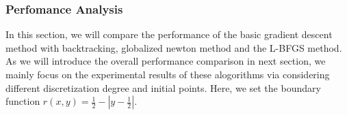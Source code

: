 \subsubsection{Perfomance Analysis}

In this section, we will compare the performance of the basic gradient descent method with backtracking, globalized newton method and the L-BFGS method. As we will introduce the overall performance comparison in next section, we mainly focus on the experimental results of these alogorithms via considering different discretization degree and initial points. Here, we set the boundary function $r(x, y)=\frac{1}{2}-\left|y-\frac{1}{2}\right|$.
\begin{figure}[!htbp]
    \centering
\end{figure}
